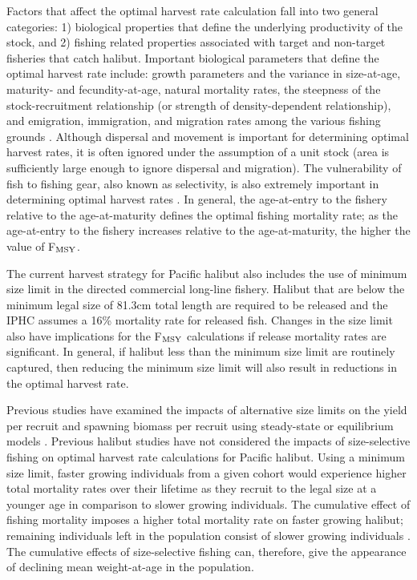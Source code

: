 Factors that affect the optimal harvest rate calculation fall into two general categories: 1) biological properties that define the underlying productivity of the stock, and 2) fishing related properties associated with target and non-target fisheries that catch halibut.  Important biological parameters that define the optimal harvest rate include: growth parameters and the variance in size-at-age, maturity- and fecundity-at-age, natural mortality rates, the steepness of the stock-recruitment relationship (or strength of density-dependent relationship), and emigration, immigration, and migration rates among the various fishing grounds \citep{Beddington2005}. Although  dispersal and movement is important for determining optimal harvest rates, it is often ignored under the assumption of a unit stock (area is sufficiently large enough to ignore dispersal and migration). The vulnerability of fish to fishing gear, also known as selectivity, is also extremely important in determining optimal harvest rates \citep{hilborn1992quantitative}.  In general, the age-at-entry to the fishery relative to the age-at-maturity defines the optimal fishing mortality rate; as the age-at-entry to the fishery increases relative to the age-at-maturity, the higher the value of F$_{\rm{MSY}}$.


The current harvest strategy for Pacific halibut also includes the use of minimum size limit in the directed commercial long-line fishery. Halibut that are below the minimum legal size of 81.3cm total length are required to be released and the IPHC assumes a 16\% mortality rate for released fish.  Changes in the size limit also have implications for the F$_{\rm{MSY}}$ calculations if release mortality rates are significant. In general, if halibut less than the minimum size limit are routinely captured, then reducing the minimum size limit will also result in reductions in the optimal harvest rate.

Previous studies have examined the impacts of alternative size limits on the yield per recruit and spawning biomass per recruit using steady-state or equilibrium models \citep{clark1995re}.  Previous halibut studies have not considered the impacts of size-selective fishing on optimal harvest rate calculations for Pacific halibut.  Using a minimum size limit, faster growing individuals from a given cohort would experience higher total mortality rates over their lifetime as they recruit to the legal size at a younger age in comparison to slower growing individuals. The cumulative effect of fishing mortality imposes a higher total mortality rate on faster growing halibut; remaining individuals left in the population consist of slower growing individuals \citep{Taylor2005}.  The cumulative effects of size-selective fishing can, therefore, give the appearance of declining mean weight-at-age in the population.


